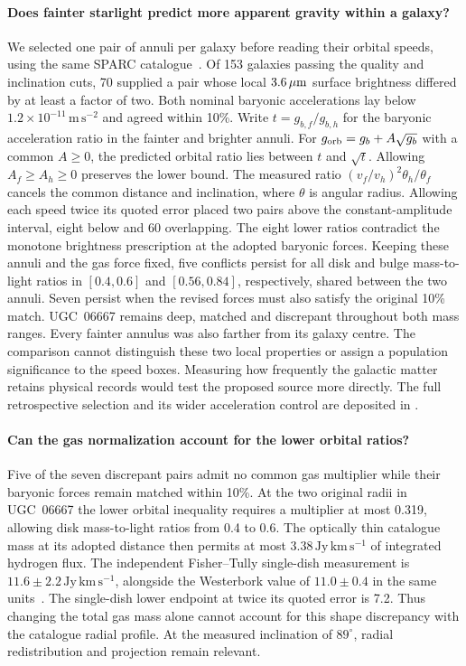 \documentclass[11pt]{article}
\begin{document}
\paragraph{Does fainter starlight predict more apparent gravity within a galaxy?}
We selected one pair of annuli per galaxy before reading their orbital speeds,
using the same SPARC catalogue~\cite{sparc2016}. Of 153 galaxies passing
the quality and inclination cuts, 70 supplied a pair whose local
$3.6\,\mu{\rm m}$ surface brightness differed by at least a factor of two.
Both nominal baryonic accelerations lay below
$1.2\times10^{-11}\,\mathrm{m\,s^{-2}}$ and agreed within 10\%.
Write $t=g_{b,f}/g_{b,h}$ for the baryonic acceleration ratio in the
fainter and brighter annuli. For $g_{\rm orb}=g_b+A\sqrt{g_b}$ with a
common $A\ge0$, the predicted orbital ratio lies between $t$ and $\sqrt t$.
Allowing $A_f\ge A_h\ge0$ preserves the lower bound.
The measured ratio $(v_f/v_h)^2\theta_h/\theta_f$ cancels the common
distance and inclination, where $\theta$ is angular radius.
Allowing each speed twice its quoted error placed two pairs above the
constant-amplitude interval, eight below and 60 overlapping.
The eight lower ratios contradict the monotone brightness prescription
at the adopted baryonic forces. Keeping these annuli and the gas force
fixed, five conflicts persist for all disk and bulge mass-to-light ratios
in $[0.4,0.6]$ and $[0.56,0.84]$, respectively, shared between the two
annuli. Seven persist when the revised forces must also satisfy the
original 10\% match. UGC~06667 remains deep, matched and discrepant
throughout both mass ranges. Every fainter annulus was also farther
from its galaxy centre. The comparison cannot distinguish these two
local properties or assign a population significance to the speed boxes.
Measuring how frequently the galactic matter retains physical records
would test the proposed source more directly. The full retrospective
selection and its wider acceleration control are deposited in
.

\paragraph{Can the gas normalization account for the lower orbital ratios?}
Five of the seven discrepant pairs admit no common gas multiplier while
their baryonic forces remain matched within 10\%. At the two original
radii in UGC~06667 the lower orbital inequality requires a multiplier
at most 0.319, allowing disk mass-to-light ratios from 0.4 to 0.6.
The optically thin catalogue mass at its adopted distance then permits
at most $3.38\,\mathrm{Jy\,km\,s^{-1}}$ of integrated hydrogen flux.
The independent Fisher--Tully single-dish measurement is
$11.6\pm2.2\,\mathrm{Jy\,km\,s^{-1}}$, alongside the Westerbork value
of $11.0\pm0.4$ in the same units~\cite{ursaflux}. The single-dish
lower endpoint at twice its quoted error is 7.2. Thus changing the
total gas mass alone cannot account for this shape discrepancy with
the catalogue radial profile. At the measured inclination of
$89^\circ$, radial redistribution and projection remain relevant.
\end{document}
